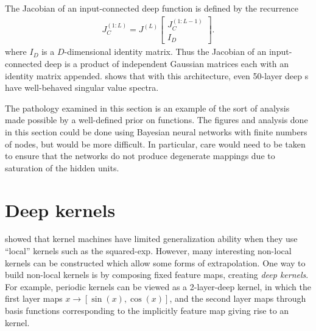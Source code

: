 \documentclass{article} %
\begin{document}
The Jacobian of an input-connected deep function is defined by the recurrence
%
\newcommand{\sbi}[2]{\left[ \! \begin{array}{c} #1 \\ #2 \end{array} \! \right]} 
\begin{align}
{J_C^{(1:L)} = J^{(L)} \sbi{ J_C^{(1:L-1)}}{I_D}}.
\end{align}
%
%
%
where $I_D$ is a $D$-dimensional identity matrix.
Thus the Jacobian of an input-connected deep \gp{} is a product of independent Gaussian matrices each with an identity matrix appended.
 shows that with this architecture, even 50-layer deep \gp{}s have well-behaved singular value spectra.

The pathology examined in this section is an example of the sort of analysis made possible by a well-defined prior on functions.
The figures and analysis done in this section could be done using Bayesian neural networks with finite numbers of nodes, but would be more difficult.
In particular, care would need to be taken to ensure that the networks do not produce degenerate mappings due to saturation of the hidden units.





\section{Deep kernels}
\label{sec:deep_kernels}


 

\cite{ bengio2006curse} showed that kernel machines have limited generalization ability when they use ``local'' kernels such as the squared-exp.
However, many interesting non-local kernels can be constructed which allow some forms of extrapolation.
One way to build non-local kernels is by composing fixed feature maps, creating \emph{deep kernels}.
For example, periodic kernels can be viewed as a 2-layer-deep kernel, in which the first layer maps $x \rightarrow [\sin(x), \cos(x)]$, and the second layer maps through basis functions corresponding to the implicitly feature map giving rise to an \kSE{} kernel.
\end{document}
